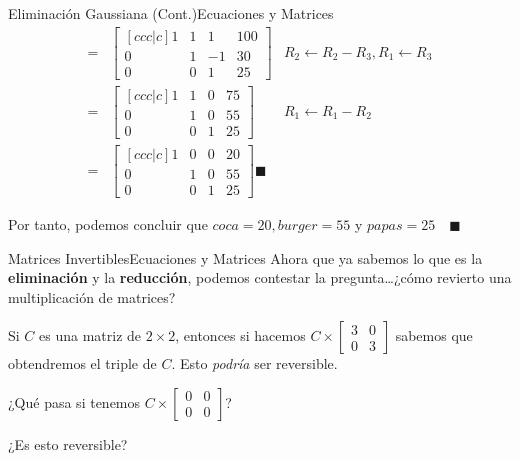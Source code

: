 \documentclass[spanish, c]{beamer}
\begin{document}
\begin{frame}{Eliminación Gaussiana (Cont.)}{Ecuaciones y Matrices}
    \begin{align*}
        = & \begin{bmatrix}[ccc|c]
            1 & 1 & 1 & 100 \\
            0 & 1 & -1 & 30 \\
            0 & 0 & 1 & 25
        \end{bmatrix}
        & R_2 \gets R_2 - R_3, R_1 \gets R_3 \\
        = & \begin{bmatrix}[ccc|c]
            1 & 1 & 0 & 75 \\
            0 & 1 & 0 & 55 \\
            0 & 0 & 1 & 25
        \end{bmatrix}
        & R_1 \gets R_1 - R_2 \\
        = & \begin{bmatrix}[ccc|c]
            1 & 0 & 0 & 20 \\
            0 & 1 & 0 & 55 \\
            0 & 0 & 1 & 25
        \end{bmatrix} \blacksquare
    \end{align*}

    Por tanto, podemos concluir que $coca = 20, burger = 55$ y $papas = 25 \quad \blacksquare$


\end{frame}

\begin{frame}{Matrices Invertibles}{Ecuaciones y Matrices}
    Ahora que ya sabemos lo que es la \textbf{eliminación} y la \textbf{reducción}, podemos contestar la pregunta\dots ¿cómo revierto una multiplicación de matrices? \pause

    \bigskip

    Si $C$ es una matriz de $2 \times  2$, entonces si hacemos $C \times \begin{bmatrix*}
        3 & 0 \\ 0 & 3
    \end{bmatrix*}$ sabemos que obtendremos el triple de $C$. Esto \textit{podría} ser reversible. \pause

    \bigskip

    ¿Qué pasa si tenemos $C \times \begin{bmatrix*}
        0 & 0 \\ 0 & 0
    \end{bmatrix*}$? \pause

    \bigskip

    ¿Es esto reversible?

\end{frame}
\end{document}
